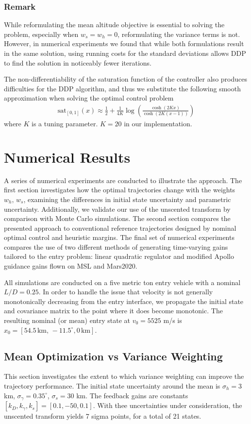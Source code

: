 \documentclass[letterpaper, paper,11pt]{AAS}
\begin{document}
\subsubsection{Remark} While reformulating the mean altitude objective is essential to solving the problem, especially when $w_s=w_h=0$, reformulating the variance terms is not. However, in numerical experiments we found that while both formulations result in the same solution, using running costs for the standard deviations allows DDP to find the solution in noticeably fewer iterations.

The non-differentiability of the saturation function of the controller also produces difficulties for the DDP algorithm, and thus we substitute the following smooth approximation when solving the optimal control problem
\begin{align*}
\mathrm{sat}_{[0,1]}(x) \approx \frac{1}{2} + \frac{1}{4K}\log\left(\frac{\cosh (2Kx)}{\cosh (2K(x-1))}\right) 
\end{align*}
where $K$ is a tuning parameter. $K=20$ in our implementation.

\section{Numerical Results}
A series of numerical experiments are conducted to illustrate the approach. The first section investigates how the optimal trajectories change with the weights $w_h,\,w_s$, examining the differences in initial state uncertainty and parametric uncertainty. Additionally, we validate our use of the unscented transform by comparison with Monte Carlo simulations. The second section compares the presented approach to conventional reference trajectories designed by nominal optimal control and heuristic margins. The final set of numerical experiments compares the use of two different methods of generating time-varying gains tailored to the entry problem: linear quadratic regulator and modified Apollo guidance gains flown on MSL and Mars2020.

All simulations are conducted on a five metric ton entry vehicle with a nominal $L/D=0.25$.  In order to handle the issue that velocity is not generally monotonically decreasing from the entry interface, we propagate the initial state and covariance matrix to the point where it does become monotonic. The resulting nominal (or mean) entry state at $v_0 = 5525$ m/s is $x_0 = [54.5\,\mathrm{km},\,-11.5^{\circ}, 0\,\mathrm{km}]$.


\subsection{Mean Optimization vs Variance Weighting}
This section investigates the extent to which variance weighting can improve the trajectory performance. The initial state uncertainty around the mean is $\sigma_h = 3$ km, $\sigma_{\gamma} = 0.35^{\circ}$, $\sigma_s = 30$ km. The feedback gains are constants $[k_D, k_{\gamma}, k_s] = [0.1, -50, 0.1]$. With thee uncertainties under consideration, the unscented transform yields 7 sigma points, for a total of 21 states. 
\end{document}
